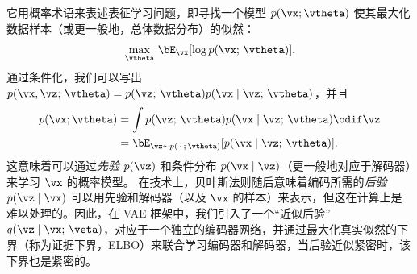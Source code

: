 \documentclass[../../book-main_zh.tex]{subfiles}
\begin{document}
它用概率术语来表述表征学习问题，即寻找一个模型 $p(\vx; \vtheta)$
使其最大化数据样本（或更一般地，总体数据分布）的似然：
\begin{equation*}
    \max_{\vtheta}\, \bE_{\vx}[ \log p(\vx;\, \vtheta) ].
\end{equation*}
通过条件化，我们可以写出 $p(\vx, \vz ;\, \vtheta)
= p(\vz;\, \vtheta) p(\vx \mid \vz;\, \vtheta)$，并且
\begin{align*}
    p(\vx; \vtheta) &= \int p(\vz;\, \vtheta) p(\vx \mid \vz;\,
    \vtheta) \odif \vz
    \\
    &=
    \bE_{\vz \sim p(\,\cdot\,;\, \vtheta)}[ p(\vx \mid \vz;\, \vtheta) ].
\end{align*}
%
这意味着可以通过\textit{先验} $p(\vz)$ 和条件分布 $p(\vx \mid \vz)$（更一般地对应于解码器）来学习 $\vx$ 的概率模型。
在技术上，贝叶斯法则随后意味着编码所需的\textit{后验} $p(\vz \mid
\vx)$ 可以用先验和解码器（以及 $\vx$ 的样本）来表示，但这在计算上是难以处理的。因此，在 VAE 框架中，我们引入了一个“近似后验”
$q(\vz \mid \vx;\, \veta)$，对应于一个独立的编码器网络，并通过最大化真实似然的下界（称为证据下界，ELBO）来联合学习编码器和解码器，当后验近似紧密时，该下界也是紧密的。
\end{document}
